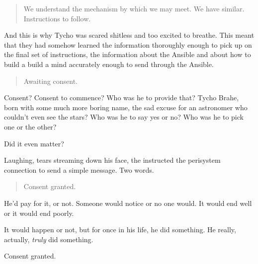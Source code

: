 \begin{quote}
We understand the mechanism by which we may meet. We have similar. Instructions to follow.
\end{quote}

And this is why Tycho was scared shitless and too excited to breathe. This meant that they had somehow learned the information thoroughly enough to pick up on the final set of instructions, the information about the Ansible and about how to build a build a mind accurately enough to send through the Ansible.

\begin{quote}
Awaiting consent.
\end{quote}

Consent? Consent to commence? Who was he to provide that? Tycho Brahe, born with some much more boring name, the sad excuse for an astronomer who couldn't even see the stars? Who was he to say yes or no? Who was he to pick one or the other?

Did it even matter?

Laughing, tears streaming down his face, the instructed the perisystem connection to send a simple message. Two words.

\begin{quote}
Consent granted.
\end{quote}

He'd pay for it, or not. Someone would notice or no one would. It would end well or it would end poorly.

It would happen or not, but for once in his life, he did something. He really, actually, \emph{truly} did something.

Consent granted.
